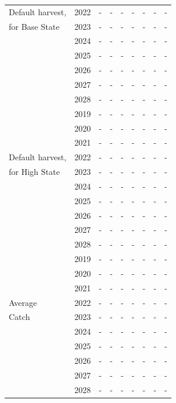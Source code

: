 \documentclass[12pt,]{article}
\begin{document}
\begin{table}[ht]
{\begin{tabular}{l|cc|>{\centering}p{.7in}c|>{\centering}p{.7in}c|>{\centering}p{.7in}c}
  Default harvest,  & 2022 & - & - & - & - & - & - & - \\ 
  for Base State & 2023 & - & - & - & - & - & - & - \\ 
   & 2024 & - & - & - & - & - & - & - \\ 
   & 2025 & - & - & - & - & - & - & - \\ 
   & 2026 & - & - & - & - & - & - & - \\ 
   & 2027 & - & - & - & - & - & - & - \\ 
   & 2028 & - & - & - & - & - & - & - \\ 
   \hline
 & 2019 & - & - & - & - & - & - & - \\ 
   & 2020 & - & - & - & - & - & - & - \\ 
   & 2021 & - & - & - & - & - & - & - \\ 
  Default harvest,  & 2022 & - & - & - & - & - & - & - \\ 
  for High State & 2023 & - & - & - & - & - & - & - \\ 
   & 2024 & - & - & - & - & - & - & - \\ 
   & 2025 & - & - & - & - & - & - & - \\ 
   & 2026 & - & - & - & - & - & - & - \\ 
   & 2027 & - & - & - & - & - & - & - \\ 
   & 2028 & - & - & - & - & - & - & - \\ 
   \hline
 & 2019 & - & - & - & - & - & - & - \\ 
   & 2020 & - & - & - & - & - & - & - \\ 
   & 2021 & - & - & - & - & - & - & - \\ 
  Average & 2022 & - & - & - & - & - & - & - \\ 
  Catch & 2023 & - & - & - & - & - & - & - \\ 
   & 2024 & - & - & - & - & - & - & - \\ 
   & 2025 & - & - & - & - & - & - & - \\ 
   & 2026 & - & - & - & - & - & - & - \\ 
   & 2027 & - & - & - & - & - & - & - \\ 
   & 2028 & - & - & - & - & - & - & - \\ 
   \hline
\end{tabular}
}
\end{table}
\FloatBarrier

\end{document}
